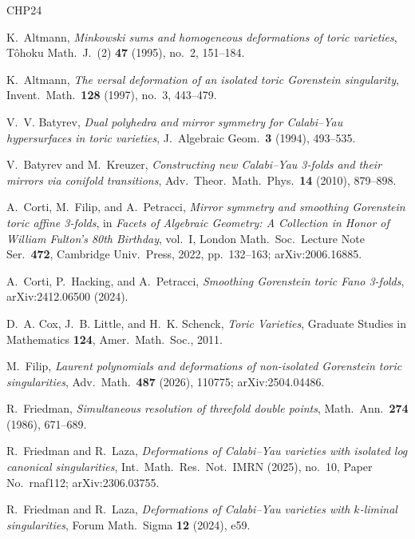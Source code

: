 \documentclass[11pt]{amsart}
\theoremstyle{definition}
\theoremstyle{remark}
\begin{document}
\begin{thebibliography}{CHP24}

K.~Altmann,
\emph{Minkowski sums and homogeneous deformations of toric varieties},
T\^ohoku Math.\ J.\ (2) \textbf{47} (1995), no.~2, 151--184.

K.~Altmann,
\emph{The versal deformation of an isolated toric Gorenstein singularity},
Invent.\ Math.\ \textbf{128} (1997), no.~3, 443--479.

V.~V. Batyrev,
\emph{Dual polyhedra and mirror symmetry for Calabi--Yau hypersurfaces in
toric varieties},
J.\ Algebraic Geom.\ \textbf{3} (1994), 493--535.

V.~Batyrev and M.~Kreuzer,
\emph{Constructing new Calabi--Yau 3-folds and their mirrors via conifold
transitions},
Adv.\ Theor.\ Math.\ Phys.\ \textbf{14} (2010), 879--898.

A.~Corti, M.~Filip, and A.~Petracci,
\emph{Mirror symmetry and smoothing Gorenstein toric affine 3-folds},
in \emph{Facets of Algebraic Geometry: A Collection in Honor of William
Fulton's 80th Birthday}, vol.~I, London Math.\ Soc.\ Lecture Note Ser.\
\textbf{472}, Cambridge Univ.\ Press, 2022, pp.~132--163; arXiv:2006.16885.

A.~Corti, P.~Hacking, and A.~Petracci,
\emph{Smoothing Gorenstein toric Fano 3-folds},
arXiv:2412.06500 (2024).

D.~A. Cox, J.~B. Little, and H.~K. Schenck,
\emph{Toric Varieties},
Graduate Studies in Mathematics \textbf{124}, Amer.\ Math.\ Soc., 2011.

M.~Filip,
\emph{Laurent polynomials and deformations of non-isolated Gorenstein toric
singularities},
Adv.\ Math.\ \textbf{487} (2026), 110775; arXiv:2504.04486.

R.~Friedman,
\emph{Simultaneous resolution of threefold double points},
Math.\ Ann.\ \textbf{274} (1986), 671--689.

R.~Friedman and R.~Laza,
\emph{Deformations of Calabi--Yau varieties with isolated log canonical
singularities},
Int.\ Math.\ Res.\ Not.\ IMRN (2025), no.~10, Paper No.\ rnaf112;
arXiv:2306.03755.

R.~Friedman and R.~Laza,
\emph{Deformations of Calabi--Yau varieties with $k$-liminal singularities},
Forum Math.\ Sigma \textbf{12} (2024), e59.


\end{thebibliography}
\end{document}
